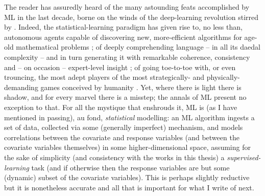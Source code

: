 The reader has assuredly heard of the many astounding feats accomplished by ML in the last decade,
borne on the winds of the deep-learning revolution stirred by \cite{krizhevsky2012imagenet}.
%
Indeed, the statistical-learning paradigm has given rise to, no less than, autonomous agents
capable of discovering new, more-efficient algorithms for age-old mathematical problems
\citep{fawzi2022discovering}; of deeply comprehending language -- in all its daedal complexity --
and in turn generating it with remarkable coherence, consistency and -- on occasion -- expert-level
insight \citep{brown2020language}; of going toe-to-toe with, or even trouncing, the most adept
players of the most strategically- and physically-demanding games conceived by humanity
\citep{silver2017mastering,berner2019dota,vinyals2019grandmaster,meta2022human}.
%
Yet, where there is light there is shadow, and for every marvel there is a misstep; the annals of
ML present no exception to that.
%
For all the mystique that enshrouds it, ML is (as I have mentioned in passing), au fond,
\emph{statistical} modelling: an ML algorithm ingests a set of data, collected via some (generally
imperfect) mechanism, and models correlations between the covariate and response variables (and
between the covariate variables themselves) in some higher-dimensional space, assuming for the sake
of simplicity (and consistency with the works in this thesis) a \emph{supervised-learning} task
(and if otherwise then the response variables are but some (dynamic) subset of the covariate
variables).
%
This is perhaps slightly reductive but it is nonetheless accurate and all that is important for
what I write of next.

